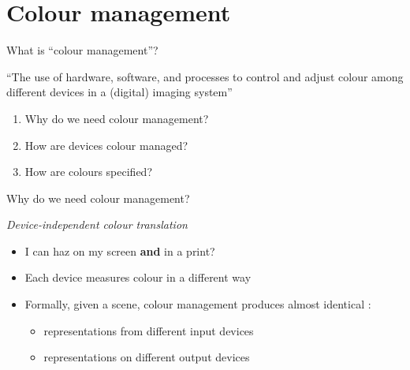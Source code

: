 \documentclass[final, aspectratio=169]{divoc}
\begin{document}
\section{Colour management}
\begin{frame}{What is \enquote{colour management}?}
  \begin{definition}
    \enquote{The use of hardware, software, and processes to control and adjust colour among different devices in a (digital) imaging system} \autocite{sharma}
  \end{definition}

  \begin{enumerate}
    \item Why do we need colour management?
    \item How are devices colour managed?
    \item How are colours specified?
  \end{enumerate}
\end{frame}
\begin{frame}{Why do we need colour management?}
  \begin{center}
    \emph{Device-independent colour translation}
  \end{center}

  \begin{itemize}[<+(1)->]
    \item {} I can haz \colorbox{baseColor3}{\phantom{AKI}} on my screen \textbf{and} in a print?
    \item Each device measures colour in a different way
    \item Formally, given a scene, colour management produces almost identical \autocite{allen}:
          \begin{itemize}
            \item representations from different input devices
            \item representations on different output devices
          \end{itemize}
  \end{itemize}
\end{frame}
\end{document}
